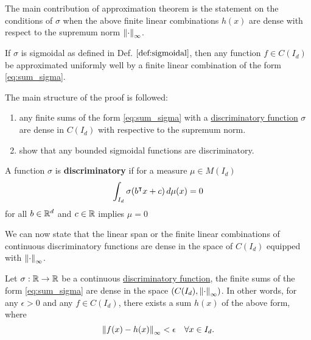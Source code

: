 The main contribution of approximation theorem is the statement on the
conditions of $\sigma$ when the above finite linear combinations $h(x)$ are
dense with respect to the supremum norm $\left\| \cdot \right\|_{\infty}$.

\begin{theorem}
    \label{thm:uat}
    If $\sigma$ is sigmoidal as defined in Def. $\ref{def:sigmoidal}$, then any
    function $f \in C(I_d)$ be approximated uniformly well by a finite linear
    combination of the form \eqref{eq:sum_sigma}.
\end{theorem}


The main structure of the proof is followed:
\begin{enumerate}
    \item any finite sums of the form \eqref{eq:sum_sigma} with a
    \hyperref[def:dis_func]{discriminatory function} $\sigma$ are dense in
    $C(I_d)$ with respective to the supremum norm.
    \item show that any bounded sigmoidal functions are discriminatory.
\end{enumerate}

\begin{definition}
    \label{def:dis_func}
    A function $\sigma$ is \textbf{discriminatory} if for a measure $\mu \in
    M(I_d)$
    \begin{equation}
        \int_{I_d} \sigma(b{}^{\intercal} x + c) \,d\mu(x) = 0
    \end{equation}
    for all $b \in \mathbb{R}^d$ and $c \in \mathbb{R}$ implies $\mu = 0$
\end{definition}

We can now state that the linear span or the finite linear combinations of
continuous discriminatory functions are dense in the space of $C(I_d)$ equipped
with $\left\| \cdot \right\|_{\infty}$.

\begin{theorem}
    Let $\sigma: \mathbb{R} \to \mathbb{R}$ be a
    continuous \hyperref[def:dis_func]{discriminatory function}, the finite sums
    of the form \eqref{eq:sum_sigma} are dense in the space $(C(I_d),
    \left\| \cdot \right\|_{\infty})$. In other words, for any $\epsilon > 0$ and any
    $f \in C(I_d)$, there exists a sum $h(x)$ of the above form, where
    \begin{equation}
        \left\| f(x) - h(x) \right\|_{\infty} < \epsilon \quad \forall x \in I_d.
    \end{equation}
\end{theorem}

